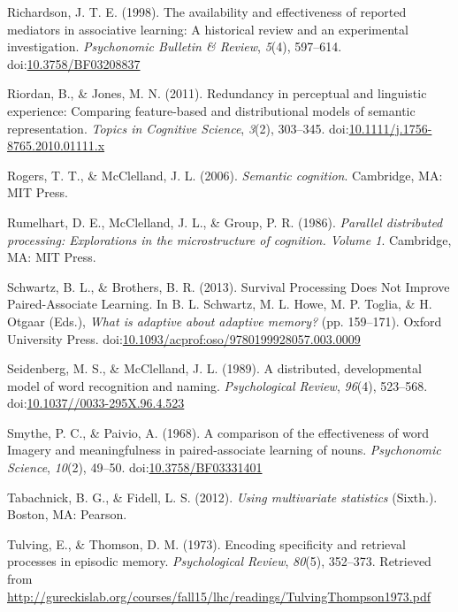 \documentclass[english,,man]{apa6}
\begin{document}
\hypertarget{ref-Richardson1998}{}
Richardson, J. T. E. (1998). The availability and effectiveness of
reported mediators in associative learning: A historical review and an
experimental investigation. \emph{Psychonomic Bulletin \& Review},
\emph{5}(4), 597--614.
doi:\href{https://doi.org/10.3758/BF03208837}{10.3758/BF03208837}

\hypertarget{ref-Riordan2011}{}
Riordan, B., \& Jones, M. N. (2011). Redundancy in perceptual and
linguistic experience: Comparing feature-based and distributional models
of semantic representation. \emph{Topics in Cognitive Science},
\emph{3}(2), 303--345.
doi:\href{https://doi.org/10.1111/j.1756-8765.2010.01111.x}{10.1111/j.1756-8765.2010.01111.x}

\hypertarget{ref-Rogers2006}{}
Rogers, T. T., \& McClelland, J. L. (2006). \emph{Semantic cognition}.
Cambridge, MA: MIT Press.

\hypertarget{ref-Rumelhart1986}{}
Rumelhart, D. E., McClelland, J. L., \& Group, P. R. (1986).
\emph{Parallel distributed processing: Explorations in the
microstructure of cognition. Volume 1}. Cambridge, MA: MIT Press.

\hypertarget{ref-Schwartz2013}{}
Schwartz, B. L., \& Brothers, B. R. (2013). Survival Processing Does Not
Improve Paired-Associate Learning. In B. L. Schwartz, M. L. Howe, M. P.
Toglia, \& H. Otgaar (Eds.), \emph{What is adaptive about adaptive
memory?} (pp. 159--171). Oxford University Press.
doi:\href{https://doi.org/10.1093/acprof:oso/9780199928057.003.0009}{10.1093/acprof:oso/9780199928057.003.0009}

\hypertarget{ref-Seidenberg1989a}{}
Seidenberg, M. S., \& McClelland, J. L. (1989). A distributed,
developmental model of word recognition and naming. \emph{Psychological
Review}, \emph{96}(4), 523--568.
doi:\href{https://doi.org/10.1037//0033-295X.96.4.523}{10.1037//0033-295X.96.4.523}

\hypertarget{ref-Smythe1968}{}
Smythe, P. C., \& Paivio, A. (1968). A comparison of the effectiveness
of word Imagery and meaningfulness in paired-associate learning of
nouns. \emph{Psychonomic Science}, \emph{10}(2), 49--50.
doi:\href{https://doi.org/10.3758/BF03331401}{10.3758/BF03331401}

\hypertarget{ref-Tabachnick2012}{}
Tabachnick, B. G., \& Fidell, L. S. (2012). \emph{Using multivariate
statistics} (Sixth.). Boston, MA: Pearson.

\hypertarget{ref-Thomson1973}{}
Tulving, E., \& Thomson, D. M. (1973). Encoding specificity and
retrieval processes in episodic memory. \emph{Psychological Review},
\emph{80}(5), 352--373. Retrieved from
\url{http://gureckislab.org/courses/fall15/lhc/readings/TulvingThompson1973.pdf}
\end{document}
